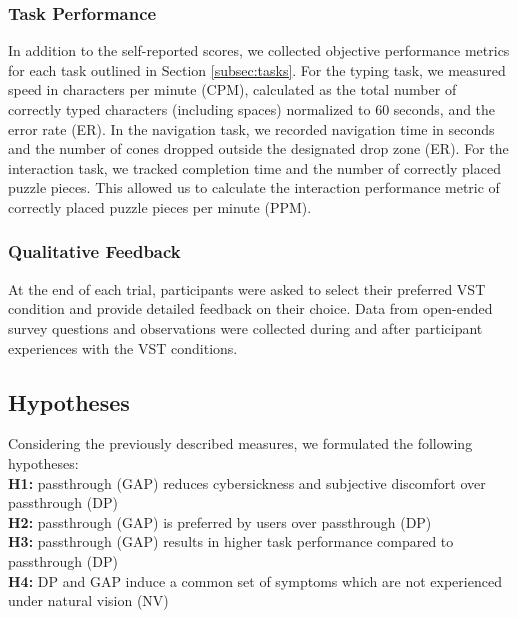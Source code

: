 \subsubsection{Task Performance} In addition to the self-reported scores, we collected objective performance metrics for each task outlined in Section \ref{subsec:tasks}. For the typing task, we measured speed in characters per minute (CPM), calculated as the total number of correctly typed characters (including spaces) normalized to 60 seconds, and the error rate (ER). In the navigation task, we recorded navigation time in seconds and the number of cones dropped outside the designated drop zone (ER). For the interaction task, we tracked completion time and the number of correctly placed puzzle pieces. This allowed us to calculate the interaction performance metric of correctly placed puzzle pieces per minute (PPM).
\subsubsection{Qualitative Feedback} At the end of each trial, participants were asked to select their preferred VST condition and provide detailed feedback on their choice. Data from open-ended survey questions and observations were collected during and after participant experiences with the VST conditions. 

\subsection{Hypotheses}
Considering the previously described measures, we formulated the following hypotheses:\\
 \textbf{\hypertarget{hypo:H1}{H1}:} \Depthpassthrough passthrough (GAP) reduces cybersickness and subjective discomfort over \Directpassthrough passthrough (DP) \\
 \textbf{\hypertarget{hypo:H2}{H2}:} \Depthpassthrough passthrough (GAP) is preferred by users over \Directpassthrough passthrough (DP) \\
 \textbf{\hypertarget{hypo:H3}{H3}:} \Depthpassthrough passthrough (GAP) results in higher task performance compared to \Directpassthrough passthrough (DP) \\
 \textbf{\hypertarget{hypo:H4}{H4}:} DP and GAP induce a common set of symptoms which are not experienced under natural vision (NV)

